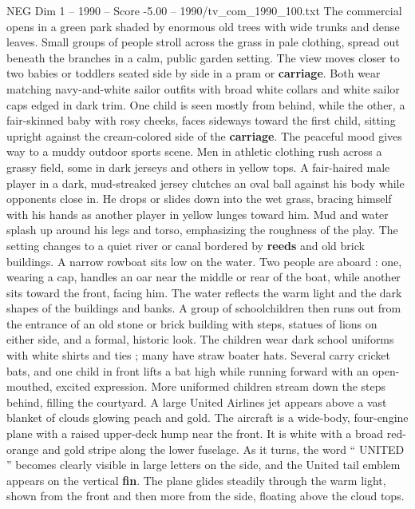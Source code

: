 \begin{textsample}{NEG Dim 1 – 1990 – Score -5.00 – 1990/tv\_com\_1990\_100.txt}  \label{ex:f1_neg_051}
The commercial opens in a green park shaded by enormous old trees with wide trunks and dense leaves.
Small groups of people stroll across the grass in pale clothing, spread out beneath the branches in a calm, public garden setting.
The view moves closer to two babies or toddlers seated side by side in a pram or \textbf{carriage}.
Both wear matching navy-and-white sailor outfits with broad white collars and white sailor caps edged in dark trim.
One child is seen mostly from behind, while the other, a fair-skinned baby with rosy cheeks, faces sideways toward the first child, sitting upright against the cream-colored side of the \textbf{carriage}.
The peaceful mood gives way to a muddy outdoor sports scene.
Men in athletic clothing rush across a grassy field, some in dark jerseys and others in yellow tops.
A fair-haired male player in a dark, mud-streaked jersey clutches an oval ball against his body while opponents close in.
He drops or slides down into the wet grass, bracing himself with his hands as another player in yellow lunges toward him.
Mud and water splash up around his legs and torso, emphasizing the roughness of the play.
The setting changes to a quiet river or canal bordered by \textbf{reeds} and old brick buildings.
A narrow rowboat sits low on the water.
Two people are aboard : one, wearing a cap, handles an oar near the middle or rear of the boat, while another sits toward the front, facing him.
The water reflects the warm light and the dark shapes of the buildings and banks.
A group of schoolchildren then runs out from the entrance of an old stone or brick building with steps, statues of lions on either side, and a formal, historic look.
The children wear dark school uniforms with white shirts and ties ; many have straw boater hats.
Several carry cricket bats, and one child in front lifts a bat high while running forward with an open-mouthed, excited expression.
More uniformed children stream down the steps behind, filling the courtyard.
A large United Airlines jet appears above a vast blanket of clouds glowing peach and gold.
The aircraft is a wide-body, four-engine plane with a raised upper-deck hump near the front.
It is white with a broad red-orange and gold stripe along the lower fuselage.
As it turns, the word “ UNITED ” becomes clearly visible in large letters on the side, and the United tail emblem appears on the vertical \textbf{fin}.
The plane glides steadily through the warm light, shown from the front and then more from the side, floating above the cloud tops.

\end{textsample}
